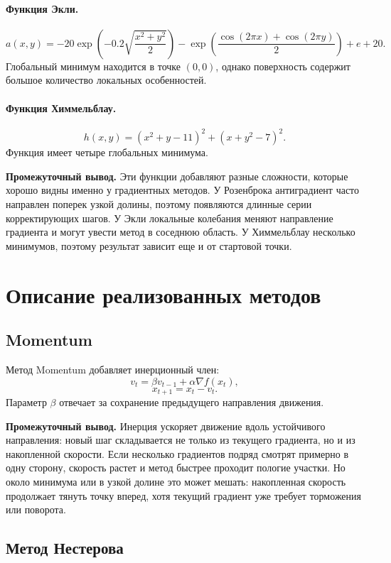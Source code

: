 ﻿\documentclass[14pt,a4paper]{extarticle}
\begin{document}
\paragraph{Функция Экли.}
\[
    a(x,y)=-20\exp\left(-0.2\sqrt{\frac{x^2+y^2}{2}}\right)
    -\exp\left(\frac{\cos(2\pi x)+\cos(2\pi y)}{2}\right)+e+20.
\]
Глобальный минимум находится в точке $(0,0)$, однако поверхность содержит большое количество локальных особенностей.

\paragraph{Функция Химмельблау.}
\[
    h(x,y)=(x^2+y-11)^2+(x+y^2-7)^2.
\]
Функция имеет четыре глобальных минимума.

\textbf{Промежуточный вывод.} Эти функции добавляют разные сложности, которые хорошо видны именно у градиентных методов. У Розенброка антиградиент часто направлен поперек узкой долины, поэтому появляются длинные серии корректирующих шагов. У Экли локальные колебания меняют направление градиента и могут увести метод в соседнюю область. У Химмельблау несколько минимумов, поэтому результат зависит еще и от стартовой точки.

\section{Описание реализованных методов}

\subsection{Momentum}

Метод Momentum добавляет инерционный член:
\[
    v_t=\beta v_{t-1}+\alpha\nabla f(x_t),
\]
\[
    x_{t+1}=x_t-v_t.
\]
Параметр $\beta$ отвечает за сохранение предыдущего направления движения.

\textbf{Промежуточный вывод.} Инерция ускоряет движение вдоль устойчивого направления: новый шаг складывается не только из текущего градиента, но и из накопленной скорости. Если несколько градиентов подряд смотрят примерно в одну сторону, скорость растет и метод быстрее проходит пологие участки. Но около минимума или в узкой долине это может мешать: накопленная скорость продолжает тянуть точку вперед, хотя текущий градиент уже требует торможения или поворота.

\subsection{Метод Нестерова}
\end{document}
